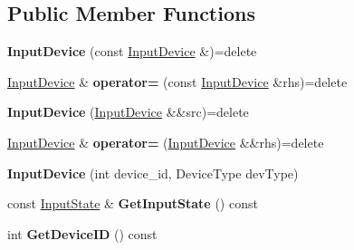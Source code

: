 \subsection*{Public Member Functions}
\begin{DoxyCompactItemize}
\item 
\mbox{\label{class_blade_1_1_input_device_a15fe798555362cbdb43f24d6ffd6c6d5}} 
{\bfseries Input\+Device} (const \hyperlink{class_blade_1_1_input_device}{Input\+Device} \&)=delete
\item 
\mbox{\label{class_blade_1_1_input_device_a9df7cd958600cc44a020bf92998ac0a6}} 
\hyperlink{class_blade_1_1_input_device}{Input\+Device} \& {\bfseries operator=} (const \hyperlink{class_blade_1_1_input_device}{Input\+Device} \&rhs)=delete
\item 
\mbox{\label{class_blade_1_1_input_device_a4c17142daef8c51926d9c77a13c023e2}} 
{\bfseries Input\+Device} (\hyperlink{class_blade_1_1_input_device}{Input\+Device} \&\&src)=delete
\item 
\mbox{\label{class_blade_1_1_input_device_ac9b63f949dba2011abded48a1237d08f}} 
\hyperlink{class_blade_1_1_input_device}{Input\+Device} \& {\bfseries operator=} (\hyperlink{class_blade_1_1_input_device}{Input\+Device} \&\&rhs)=delete
\item 
\mbox{\label{class_blade_1_1_input_device_a3d54abe984387d8748ff4d8868bb458f}} 
{\bfseries Input\+Device} (int device\+\_\+id, Device\+Type dev\+Type)
\item 
\mbox{\label{class_blade_1_1_input_device_a0c652079b55274cf661ecf2657f65967}} 
const \hyperlink{struct_blade_1_1_input_state}{Input\+State} \& {\bfseries Get\+Input\+State} () const
\item 
\mbox{\label{class_blade_1_1_input_device_af05aace5ac1decaa1bf64bfefbcf013b}} 
int {\bfseries Get\+Device\+ID} () const
\item 
\mbox{\label{class_blade_1_1_input_device_a6c0b653604f7c2a4840116c9e893b3e5}} 

\end{DoxyCompactItemize}
